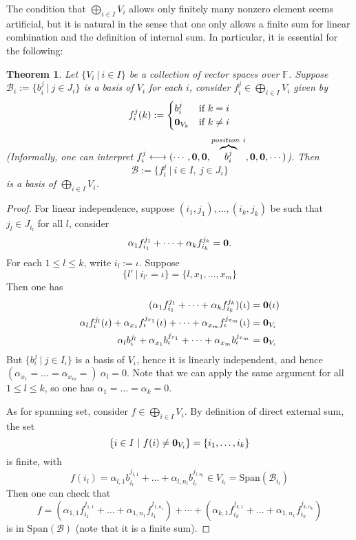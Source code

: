 \documentclass[11pt,openany]{book}
\theoremstyle{plain}
\newtheorem{theorem}{Theorem}[chapter]
\theoremstyle{definition}
\theoremstyle{remark}
\begin{document}
The condition that $\bigoplus_{i \in I} V_i$ allows only finitely many nonzero element seems artificial, but it is natural in the sense that one only allows a finite sum for linear combination and the definition of internal sum. In particular, it is essential for the following:
\begin{theorem}
    Let $\{V_i\ |\ i \in I\}$ be a collection of vector spaces over $\mathbb{F}$. Suppose $\mathcal{B}_i := \{b_{i}^j\ |\ j \in J_i\}$ is a basis of $V_i$ for each $i$, consider $f_{i}^j \in \bigoplus_{i \in I} V_i$ given by
    \begin{align*}
f_i^j(k) := \begin{cases} b_i^j  & \text{if}\ k = i\\ 
{\bf 0}_{V_k}  & \text{if}\ k \neq i\end{cases}
    \end{align*}
(Informally, one can interpret $f_i^j \longleftrightarrow (\cdots, {\bf 0},{\bf 0},  \overbrace{b_i^j}^{position\ i}, {\bf 0}, {\bf 0}, \cdots)$). Then
    $$\mathcal{B} := \{f_{i}^{j}\ |\ i \in I,\ j \in J_i\}$$
is a basis of $\bigoplus_{i \in I} V_i$.
\end{theorem}
\begin{proof}
    For linear independence, suppose $(i_1, j_1), \dots, (i_k,j_k)$ be such that $j_l \in J_{i_l}$ for all $l$, consider
    $$\alpha_1 f_{i_1}^{j_1} + \dots + \alpha_k f_{i_k}^{j_k} = {\bf 0}.$$
    For each $1 \leq l \leq k$, write $i_l := \iota$. Suppose
    $$\{l'\ |\ i_{l'} = \iota\} = \{l, x_1, \dots, x_m\}$$
    Then one has
    \begin{align*}
    (\alpha_1 f_{i_1}^{j_1} + \dots + \alpha_k f_{i_k}^{j_k})(\iota) &= {\bf 0}(\iota)\\
    \alpha_{l} f_{\iota}^{j_l}(\iota)+ \alpha_{x_1} f_{\iota}^{j_{x_1}}(\iota) + \dots + \alpha_{x_m} f_{\iota}^{j_{x_m}}(\iota) &= {\bf 0}_{V_{\iota}}\\
    \alpha_{l} b_{\iota}^{j_l} + \alpha_{x_1} b_{\iota}^{j_{x_1}} + \dots + \alpha_{x_m} b_{\iota}^{j_{x_m}} &= {\bf 0}_{V_{\iota}}
    \end{align*}
But $\{b_{\iota}^j\ |\ j \in I_{\iota}\}$ is a basis of $V_{\iota}$, hence it is linearly independent, and hence $(\alpha_{x_1} = \dots = \alpha_{x_m} =)\  \alpha_l = 0$. Note that we can apply the same argument for all $1 \leq l \leq k$, so one has $\alpha_1 = \dots = \alpha_k = 0$.

As for spanning set, consider $f \in \bigoplus_{i \in I} V_i$. By definition of direct external sum, the set 
$$\{i \in I\ |\ f(i) \neq {\bf 0}_{V_i}\} = \{i_1, \dots, i_k\}$$
is finite, with
$$f(i_l) = \alpha_{l,1} b_{i_l}^{j_{l,1}} + \dots + \alpha_{l,n_l} b_{i_l}^{j_{l,n_l}} \in V_{i_l} = \mathrm{Span}(\mathcal{B}_{i_l})$$
Then one can check that
$$f = (\alpha_{1,1} f_{i_1}^{j_{1,1}} + \dots + \alpha_{1,n_1} f_{i_1}^{j_{1,n_1}}) + \cdots + (\alpha_{k,1} f_{i_k}^{j_{k,1}} + \dots + \alpha_{1,n_1} f_{i_k}^{j_{k,n_k}})$$
is in $\mathrm{Span}(\mathcal{B})$ (note that it is a finite sum).
\end{proof}
\end{document}
